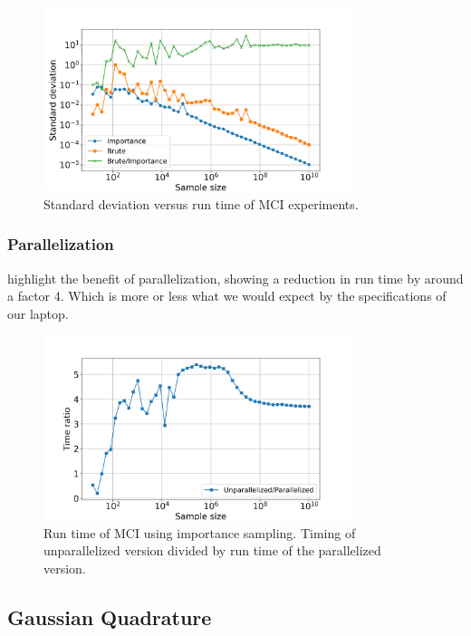 \begin{figure}[H]
  \centering
  \includegraphics[width=0.8\textwidth]{../figures/mc_std_time.png}
  \caption{Standard deviation versus run time of MCI experiments.}

  \label{fig:mc_std_time}
\end{figure}

\subsubsection{Parallelization}

 highlight the benefit of parallelization, showing a
reduction in run time by around a factor 4.
Which is more or less what we would expect
by the specifications of our laptop.

\begin{figure}[H]
  \centering
  \includegraphics[width=0.8\textwidth]{../figures/mc_time_ratio.png}
  \caption{Run time of MCI using importance sampling. Timing of unparallelized
  version divided by run time of the parallelized version.}

  \label{fig:mc_time_ratio}
\end{figure}


\subsection{Gaussian Quadrature}

